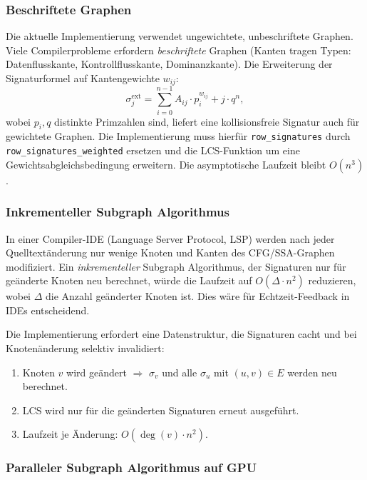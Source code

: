 ﻿\documentclass[a4paper,12pt]{article}
\theoremstyle{definition}
\begin{document}
\subsubsection{Beschriftete Graphen}

Die aktuelle Implementierung verwendet ungewichtete, unbeschriftete
Graphen. Viele Compilerprobleme erfordern \emph{beschriftete} Graphen
(Kanten tragen Typen: Datenflusskante, Kontrollflusskante,
Dominanzkante). Die Erweiterung der Signaturformel auf Kantengewichte
$w_{ij}$:
\[
\sigma_j^{\mathrm{ext}} = \sum_{i=0}^{n-1} A_{ij} \cdot p_i^{w_{ij}} + j \cdot q^n,
\]
wobei $p_i, q$ distinkte Primzahlen sind, liefert eine kollisionsfreie
Signatur auch für gewichtete Graphen. Die Implementierung muss hierfür
\texttt{row\_signatures} durch \texttt{row\_signatures\_weig\newline hted} ersetzen
und die LCS-Funktion um eine Gewichtsabgleichsbedingung erweitern. Die
asymptotische Laufzeit bleibt $O(n^3)$.

\subsubsection{Inkrementeller Subgraph Algorithmus}

In einer Compiler-IDE (Language Server Protocol, LSP) werden nach jeder
Quelltextänder\-ung nur wenige Knoten und Kanten des CFG/SSA-Graphen
modifiziert. Ein \emph{inkrementeller} Subgraph Algorithmus, der
Signaturen nur für geänderte Knoten neu berechnet, würde die Laufzeit
auf $O(\Delta \cdot n^2)$ reduzieren, wobei $\Delta$ die Anzahl
geänderter Knoten ist. Dies wäre für Echtzeit-Feedback in IDEs
entscheidend.

Die Implementierung erfordert eine Datenstruktur, die Signaturen
cacht und bei Knotenänderung selektiv invalidiert:
\begin{enumerate}
	\item Knoten $v$ wird geändert $\Rightarrow$ $\sigma_v$ und alle
	$\sigma_u$ mit $(u,v) \in E$ werden neu berechnet.
	\item LCS wird nur für die geänderten Signaturen erneut ausgeführt.
	\item Laufzeit je Änderung: $O(\deg(v) \cdot n^2)$.
\end{enumerate}

\subsubsection{Paralleler Subgraph Algorithmus auf GPU}
\end{document}
